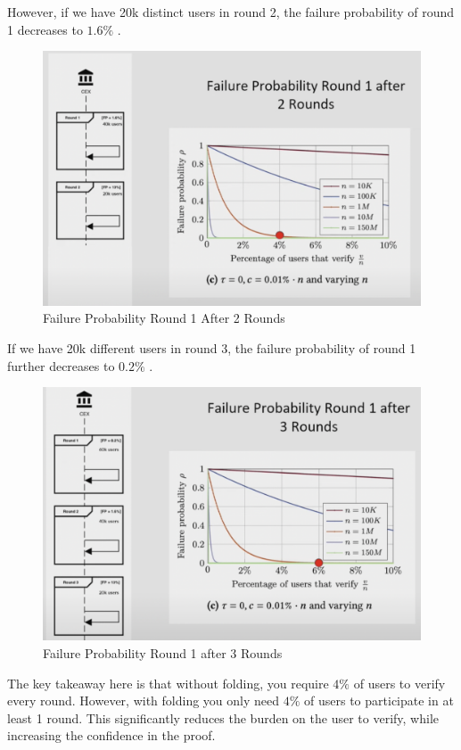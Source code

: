 However, if we have 20k distinct users in round 2, the failure probability of round 1 decreases to $1.6\%$ .

\begin{figure}[H]
   \centering
   \includegraphics[width=130mm]{FailureProbabilityRound2.png}
   \caption{Failure Probability Round 1 After 2 Rounds\cite{NS23}}
   \label{overflow}
   \end{figure}

If we have 20k different users in round 3, the failure probability of round 1 further decreases to $0.2\%$ .

\begin{figure}[H]
   \centering
   \includegraphics[width=130mm]{FailureProbabilityRound3.png}
   \caption{Failure Probability Round 1 after 3 Rounds \cite{NS23}}
   \label{overflow}
   \end{figure}
The key takeaway here is that without folding, you require $4\%$ of users to verify every round. However, with folding you only need
$4\%$  of users to participate in at least 1 round. This significantly reduces the burden on the user to verify, while increasing the confidence in the proof.

